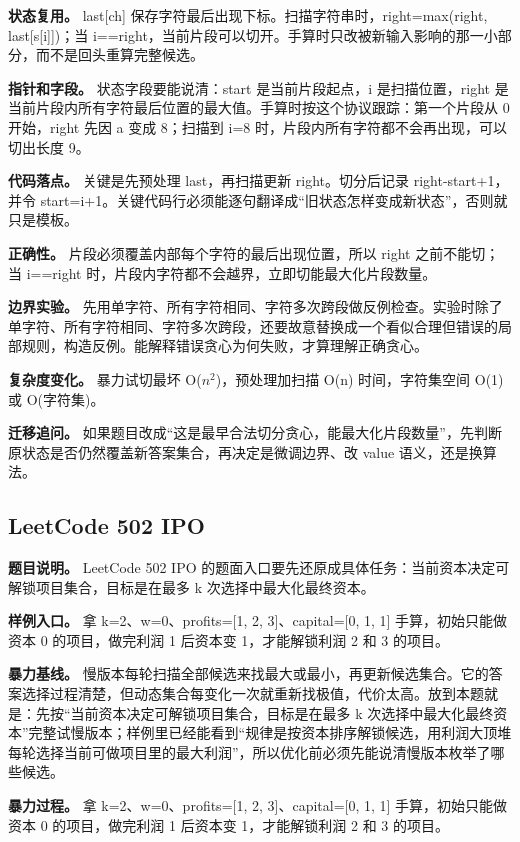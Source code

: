 \textbf{状态复用。} last[ch] 保存字符最后出现下标。扫描字符串时，right=max(right, last[s[i]])；当 i==right，当前片段可以切开。手算时只改被新输入影响的那一小部分，而不是回头重算完整候选。

\textbf{指针和字段。} 状态字段要能说清：start 是当前片段起点，i 是扫描位置，right 是当前片段内所有字符最后位置的最大值。手算时按这个协议跟踪：第一个片段从 0 开始，right 先因 a 变成 8；扫描到 i=8 时，片段内所有字符都不会再出现，可以切出长度 9。

\textbf{代码落点。} 关键是先预处理 last，再扫描更新 right。切分后记录 right-start+1，并令 start=i+1。关键代码行必须能逐句翻译成“旧状态怎样变成新状态”，否则就只是模板。

\textbf{正确性。} 片段必须覆盖内部每个字符的最后出现位置，所以 right 之前不能切；当 i==right 时，片段内字符都不会越界，立即切能最大化片段数量。

\textbf{边界实验。} 先用单字符、所有字符相同、字符多次跨段做反例检查。实验时除了单字符、所有字符相同、字符多次跨段，还要故意替换成一个看似合理但错误的局部规则，构造反例。能解释错误贪心为何失败，才算理解正确贪心。

\textbf{复杂度变化。} 暴力试切最坏 O(\ensuremath{n^{2}})，预处理加扫描 O(n) 时间，字符集空间 O(1) 或 O(字符集)。

\textbf{迁移追问。} 如果题目改成“这是最早合法切分贪心，能最大化片段数量”，先判断原状态是否仍然覆盖新答案集合，再决定是微调边界、改 value 语义，还是换算法。

\subsection{LeetCode 502 IPO}

\textbf{题目说明。} LeetCode 502 IPO 的题面入口要先还原成具体任务：当前资本决定可解锁项目集合，目标是在最多 k 次选择中最大化最终资本。

\textbf{样例入口。} 拿 k=2、w=0、profits=[1, 2, 3]、capital=[0, 1, 1] 手算，初始只能做资本 0 的项目，做完利润 1 后资本变 1，才能解锁利润 2 和 3 的项目。

\textbf{暴力基线。} 慢版本每轮扫描全部候选来找最大或最小，再更新候选集合。它的答案选择过程清楚，但动态集合每变化一次就重新找极值，代价太高。放到本题就是：先按“当前资本决定可解锁项目集合，目标是在最多 k 次选择中最大化最终资本”完整试慢版本；样例里已经能看到“规律是按资本排序解锁候选，用利润大顶堆每轮选择当前可做项目里的最大利润”，所以优化前必须先能说清慢版本枚举了哪些候选。

\textbf{暴力过程。} 拿 k=2、w=0、profits=[1, 2, 3]、capital=[0, 1, 1] 手算，初始只能做资本 0 的项目，做完利润 1 后资本变 1，才能解锁利润 2 和 3 的项目。

